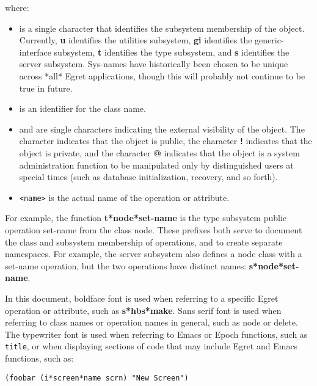 \noindent where:
\begin{itemize}
  
\item {\tt <sys-name>} is a single character that identifies the
  subsystem membership of the object.  Currently, {\bf u} identifies
  the utilities subsystem, {\bf gi} identifies the generic-interface
  subsystem, {\bf t} identifies the type subsystem, and {\bf s}
  identifies the server subsystem.  Sys-names have historically been chosen 
  to be unique across *all* Egret applications, though this will probably
  not continue to be true in future. 

\item {\tt <class-name>} is an identifier for the class name.
  
\item {\tt <sys-vis>} and {\tt <class-vis>} are single characters
  indicating the external visibility of the object. The character
  {\bf *} indicates that the object is public, the character {\bf !}
  indicates that the object is private, and the character {\bf @}
  indicates that the object is a system administration function to be
  manipulated only by distinguished users at special times (such as
  database initialization, recovery, and so forth).  

  \item {\tt <name>} is the actual name of the operation or
  attribute.

\end{itemize}

For example, the function {\bf t*node*set-name} is the type subsystem
public operation {\sf set-name} from the class {\sf node}.  These prefixes
both serve to document the class and subsystem membership of operations,
and to create separate namespaces.  For example, the server subsystem also
defines a node class with a set-name operation, but the two operations have
distinct names: {\bf s*node*set-name}.

In this document, boldface font is used when referring to a specific Egret
operation or attribute, such as {\bf s*hbs*make}.  Sans serif font
is used when referring to class names or operation names in general, such
as {\sf node} or {\sf delete}.  The typewriter font is used when referring
to Emacs or Epoch functions, such as {\tt title}, or when displaying
sections of code that may include Egret and Emacs functions, such as:

\small\begin{verbatim} 
(foobar (i*screen*name scrn) "New Screen")
\end{verbatim}\normalsize

